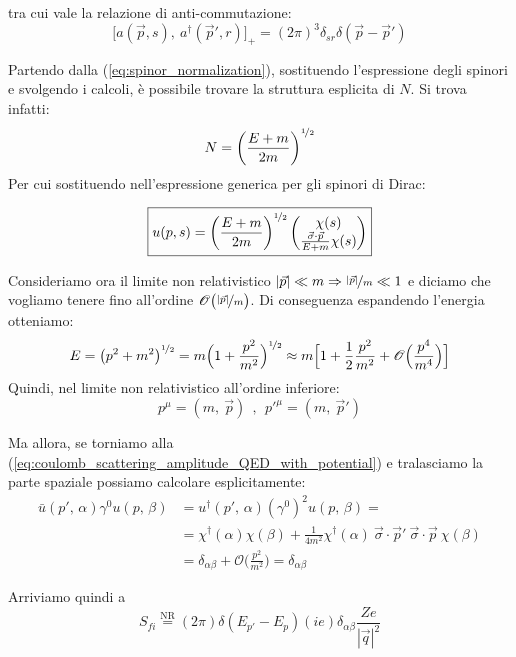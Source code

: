 \documentclass[../main.tex]{subfiles}
\begin{document}
\begin{enumerate}
\begin{nota}
        tra cui vale la relazione di anti-commutazione:
        \[
        \Big[ a(\Vec{p},s), ~a^\dagger(\Vec{p}',r) \Big]_+ = (2\pi)^3\delta_{sr}\delta(\Vec{p} - \Vec{p}')
        \]
    \end{nota}
    
    Partendo dalla (\ref{eq:spinor_normalization}), sostituendo l'espressione degli spinori e svolgendo i calcoli, è possibile trovare la struttura esplicita di $N$. Si trova infatti:
    \[
    N = \bigg( \frac{E+m}{2m} \bigg)^{\nicefrac{1}{2}}
    \]
    Per cui sostituendo nell'espressione generica per gli spinori di Dirac:

    \begin{equation}
        \boxed{
        u(p,s) = \bigg( \frac{E+m}{2m} \bigg)^{\nicefrac{1}{2}}
        \begin{pmatrix} 
            \chi(s) \\
            \frac{\Vec\sigma\cdot \Vec p}{E+m}\chi(s)
        \end{pmatrix}}
        \label{eq:spinor_structure_normalized}
    \end{equation}

    Consideriamo ora il limite non relativistico \(|\Vec{p}| \ll m \Rightarrow \nicefrac{|\Vec{p}|}{m} \ll 1\) e diciamo che vogliamo tenere fino all'ordine $\mathscr{O}\big(\nicefrac{|\Vec{p}|}{m}\big)$. Di conseguenza espandendo l'energia otteniamo:
    \[
    E = \big(p^2 + m^2\big)^{\nicefrac{1}{2}} = m \Big( 1 + \frac{p^2}{m^2}\Big)^{\nicefrac{1}{2}} \approx m\Big[1 + \frac{1}{2}\frac{p^2}{m^2} + \mathscr{O}\Big(\frac{p^4}{m^4}\Big) \Big]
    \]
    Quindi, nel limite non relativistico all'ordine inferiore:
    \[
    \boxed{p^\mu = (m,~ \Vec p)~~,~~p'^\mu = (m,~ \Vec p')}
    \]

    Ma allora, se torniamo alla (\ref{eq:coulomb_scattering_amplitude_QED_with_potential}) e tralasciamo la parte spaziale possiamo calcolare esplicitamente:
    \begin{align*}
        \bar u(p',\, \alpha) \gamma^0 u(p,\, \beta) &= u^\dagger(p',\, \alpha) (\gamma^0)^2 u(p,\, \beta) =\\
        &= \chi^\dagger(\alpha)\chi(\beta) + \frac{1}{4m^2}\chi^\dagger(\alpha) ~\Vec{\sigma}\cdot\Vec{p}'~\Vec{\sigma}\cdot\Vec{p}~\chi(\beta)\\
        & = \delta_{\alpha\beta} + \mathscr{O}\Big(\frac{p^2}{m^2}\Big) = \delta_{\alpha\beta}
    \end{align*}
    
    Arriviamo quindi a
    \begin{equation}
        \boxed{S_{fi} \overset{\text{NR}}{=} (2\pi) \delta(E_{p'} - E_p) (ie) \delta_{\alpha\beta} \frac{Ze}{|\Vec q|^2}}
        \label{eq:coulomb_scattering_amplitude_QED_NR}
    \end{equation}


\end{enumerate}
\end{document}
